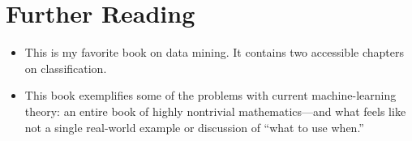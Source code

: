 \section{Further Reading}
\begin{itemize}
\item {}
  This is my favorite book on data mining. It contains two accessible
  chapters on classification.

\item {}

  This book exemplifies some of the problems with current
  machine-learning theory: an entire book of highly nontrivial
  mathematics---and what feels like not a single real-world example or
  discussion of ``what to use when.''
%
%
%
\end{itemize}
\clearpage
\
\thispagestyle{empty}
\
\clearpage

